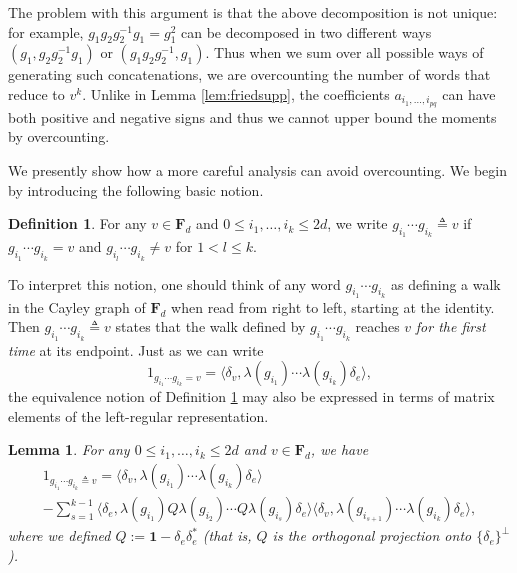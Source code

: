 \documentclass[10pt,reqno]{amsart}
\newtheorem{lem}[thm]{Lemma}
\theoremstyle{definition}
\newtheorem{defn}[thm]{Definition}
\theoremstyle{remark}
\numberwithin{equation}{section}
\numberwithin{figure}{section}
\numberwithin{table}{section}
\newcommand{\id}{\mathbf{1}}
\begin{document}
The problem with this argument is that the above decomposition is not 
unique: for example, $g_1 g_2 g_2^{-1} g_1 = g_1^2$ can be decomposed in 
two different ways $(g_1,g_2g_2^{-1}g_1)$ or $(g_1g_2g_2^{-1},g_1)$. Thus 
when we sum over all possible ways of generating such concatenations, we 
are overcounting the number of words that reduce to $v^k$. Unlike in Lemma 
\ref{lem:friedsupp}, the coefficients $a_{i_1,\ldots,i_{pq}}$ can have 
both positive and negative signs and thus we cannot upper bound the 
moments by overcounting.

We presently show how a more careful analysis can avoid overcounting.
We begin by introducing the following basic notion.

\begin{defn}
\label{defn:triangle}
For any $v\in\mathbf{F}_d$ and $0\le i_1,\ldots,i_k\le 2d$, we write
$g_{i_1}\cdots g_{i_k}\triangleq v$ if
$g_{i_1}\cdots g_{i_k}=v$ and $g_{i_l}\cdots g_{i_k}\ne v$ for
$1<l\le k$.
\end{defn}

To interpret this notion, one should think of any word $g_{i_1}\cdots 
g_{i_k}$ as defining a walk in the Cayley graph of $\mathbf{F}_d$ when 
read from right to left, starting at the identity. Then $g_{i_1}\cdots 
g_{i_k}\triangleq v$ states that the walk defined by $g_{i_1}\cdots 
g_{i_k}$ reaches $v$ \emph{for the first time} at its endpoint. 
Just as we can write
$$
	1_{g_{i_1}\cdots g_{i_k}=v}=\langle 
	\delta_v,\lambda(g_{i_1})\cdots\lambda(g_{i_k})\delta_e\rangle,
$$
the equivalence notion of Definition \ref{defn:triangle} may also be 
expressed in terms of matrix elements of the left-regular 
representation.

\begin{lem}
\label{lem:triangle}
For any $0\le i_1,\ldots,i_k\le 2d$ and $v\in\mathbf{F}_d$, we have
\begin{multline*}
        1_{g_{i_1}\cdots g_{i_k}\triangleq v} =
        \langle 
	\delta_v,\lambda(g_{i_1})\cdots\lambda(g_{i_k})\delta_e\rangle
\\
        -
        \sum_{s=1}^{k-1}
        \langle \delta_e,\lambda(g_{i_1})Q
        \lambda(g_{i_2})\cdots Q
        \lambda(g_{i_s})\delta_e\rangle
        \langle \delta_v,
        \lambda(g_{i_{s+1}})\cdots
        \lambda(g_{i_k})\delta_e\rangle,
\end{multline*}
where we defined $Q := \id - \delta_e\delta_e^*$ (that is,
$Q$ is the orthogonal projection onto $\{\delta_e\}^\perp$).
\end{lem}
\end{document}
